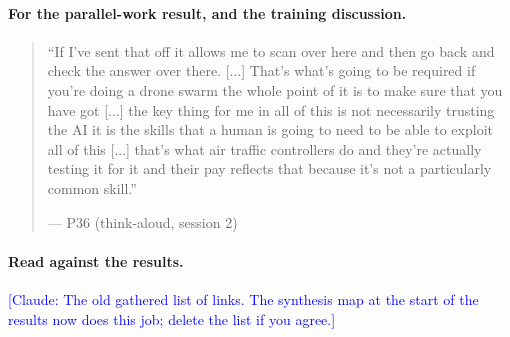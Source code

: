 \paragraph{For the parallel-work result, and the training discussion.}

\begin{quote}\small
``If I've sent that off it allows me to scan over here and then go back and check the answer over there. [...] That's what's going to be required if you're doing a drone swarm the whole point of it is to make sure that you have got [...] the key thing for me in all of this is not necessarily trusting the AI it is the skills that a human is going to need to be able to exploit all of this [...] that's what air traffic controllers do and they're actually testing it for it and their pay reflects that because it's not a particularly common skill.''\par\hfill--- P36 (think-aloud, session 2)
\end{quote}

\paragraph{Read against the results.}\label{sec:qual:practitioner:against-results}

\textcolor{blue}{[Claude: The old gathered list of links. The synthesis map at the start of the results now does this job; delete the list if you agree.]}


